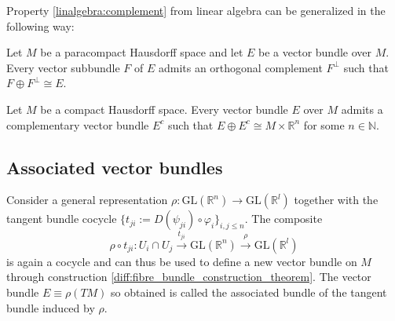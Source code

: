     Property \ref{linalgebra:complement} from linear algebra can be generalized in the following way:
    \begin{property}
        Let $M$ be a paracompact Hausdorff space and let $E$ be a vector bundle over $M$. Every vector subbundle $F$ of $E$ admits an orthogonal complement $F^\perp$ such that $F\oplus F^\perp\cong E$.
    \end{property}
    \begin{property}\label{diff:hausdorff}
        Let $M$ be a compact Hausdorff space. Every vector bundle $E$ over $M$ admits a complementary vector bundle $E^c$ such that $E\oplus E^c \cong M\times\mathbb{R}^n$ for some $n\in\mathbb{N}$.
    \end{property}


\subsection{Associated vector bundles}

    \begin{construct}\label{diff:associated_vector_bundle}
        Consider a general representation $\rho:\text{GL}(\mathbb{R}^n)\rightarrow\text{GL}(\mathbb{R}^l)$ together with the tangent bundle cocycle $\{t_{ji} := D(\psi_{ji})\circ\varphi_i\}_{i,j\leq n}$. The composite \[\rho\circ t_{ji}:U_i\cap U_j\xrightarrow{t_{ji}} \text{GL}(\mathbb{R}^n)\xrightarrow{\rho}\text{GL}(\mathbb{R}^l)\] is again a cocycle and can thus be used to define a new vector bundle on $M$ through construction \ref{diff:fibre_bundle_construction_theorem}. The vector bundle $E\equiv\rho(TM)$ so obtained is called the associated bundle of the tangent bundle induced by $\rho$.
    \end{construct}

